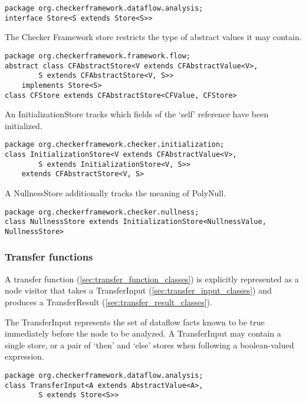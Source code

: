 \begin{verbatim}
package org.checkerframework.dataflow.analysis;
interface Store<S extends Store<S>>
\end{verbatim}

The Checker Framework store restricts the type of abstract values it
may contain.

\begin{verbatim}
package org.checkerframework.framework.flow;
abstract class CFAbstractStore<V extends CFAbstractValue<V>,
        S extends CFAbstractStore<V, S>>
    implements Store<S>
class CFStore extends CFAbstractStore<CFValue, CFStore>
\end{verbatim}

An InitializationStore tracks which fields of the `self' reference
have been initialized.

\begin{verbatim}
package org.checkerframework.checker.initialization;
class InitializationStore<V extends CFAbstractValue<V>,
        S extends InitializationStore<V, S>>
    extends CFAbstractStore<V, S>
\end{verbatim}

A NullnessStore additionally tracks the meaning of PolyNull.

\begin{verbatim}
package org.checkerframework.checker.nullness;
class NullnessStore extends InitializationStore<NullnessValue, NullnessStore>
\end{verbatim}


\subsubsection{Transfer functions}
\label{sec:transfer_functions}

A transfer function (\autoref{sec:transfer_function_classes}) is
explicitly represented as a node visitor that takes a TransferInput
(\autoref{sec:transfer_input_classes}) and produces a TransferResult
(\autoref{sec:transfer_result_classes}).

\label{sec:transfer_input_classes}

The TransferInput represents the set of dataflow facts known to be
true immediately before the node to be analyzed.  A TransferInput may
contain a single store, or a pair of `then' and `else' stores when
following a boolean-valued expression.

\begin{verbatim}
package org.checkerframework.dataflow.analysis;
class TransferInput<A extends AbstractValue<A>,
        S extends Store<S>>
\end{verbatim}

